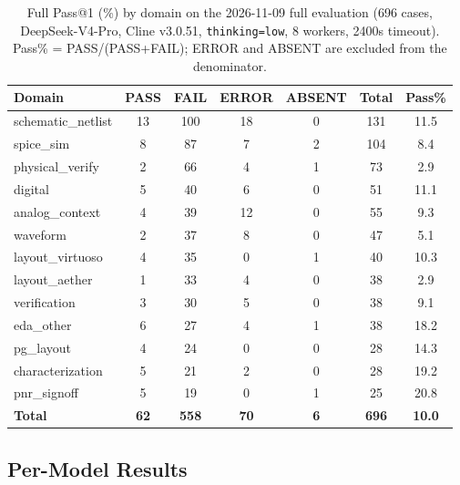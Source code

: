 \begin{table}[ht]
\centering
\small
\caption{Full Pass@1 (\%) by domain on the 2026-11-09 full evaluation (696 cases, DeepSeek-V4-Pro, Cline v3.0.51, \texttt{thinking=low}, 8 workers, 2400s timeout). Pass\% = PASS/(PASS+FAIL); ERROR and ABSENT are excluded from the denominator.}
\label{tab:full-domain-results}
\scriptsize
\begin{tabular}{@{}lcccccc@{}}
\toprule
\textbf{Domain} & \textbf{PASS} & \textbf{FAIL} & \textbf{ERROR} & \textbf{ABSENT} & \textbf{Total} & \textbf{Pass\%} \\
\midrule
schematic\_netlist & 13 & 100 & 18 & 0 & 131 & 11.5 \\
spice\_sim         & 8  & 87  & 7  & 2 & 104 & 8.4  \\
physical\_verify   & 2  & 66  & 4  & 1 & 73  & 2.9  \\
digital            & 5  & 40  & 6  & 0 & 51  & 11.1 \\
analog\_context    & 4  & 39  & 12 & 0 & 55  & 9.3  \\
waveform           & 2  & 37  & 8  & 0 & 47  & 5.1  \\
layout\_virtuoso   & 4  & 35  & 0  & 1 & 40  & 10.3 \\
layout\_aether     & 1  & 33  & 4  & 0 & 38  & 2.9  \\
verification       & 3  & 30  & 5  & 0 & 38  & 9.1  \\
eda\_other         & 6  & 27  & 4  & 1 & 38  & 18.2 \\
pg\_layout         & 4  & 24  & 0  & 0 & 28  & 14.3 \\
characterization   & 5  & 21  & 2  & 0 & 28  & 19.2 \\
pnr\_signoff       & 5  & 19  & 0  & 1 & 25  & 20.8 \\
\midrule
\textbf{Total}     & \textbf{62} & \textbf{558} & \textbf{70} & \textbf{6} & \textbf{696} & \textbf{10.0} \\
\bottomrule
\end{tabular}
\end{table}

\subsection{Per-Model Results}
\label{sec:per-model}


